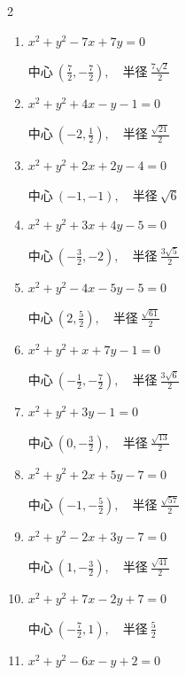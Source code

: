 \begin{multicols}{2}
\begin{enumerate}
  \item $x^{2}+y^{2}-7x+7y=0$

        $\displaystyle 中心\: \left(\frac{7}{2},-\frac{7}{2}\right), \quad 半径 \ \frac{7\sqrt{2}}{2}$

  \item $x^{2}+y^{2}+4x-y-1=0$

        $\displaystyle 中心\: \left(-2,\frac{1}{2}\right), \quad 半径 \ \frac{\sqrt{21}}{2}$

  \item $x^{2}+y^{2}+2x+2y-4=0$

        $\displaystyle 中心\: \left(-1,-1\right), \quad 半径 \ \sqrt{6}$

  \item $x^{2}+y^{2}+3x+4y-5=0$

        $\displaystyle 中心\: \left(-\frac{3}{2},-2\right), \quad 半径 \ \frac{3\sqrt{5}}{2}$

  \item $x^{2}+y^{2}-4x-5y-5=0$

        $\displaystyle 中心\: \left(2,\frac{5}{2}\right), \quad 半径 \ \frac{\sqrt{61}}{2}$

  \item $x^{2}+y^{2}+x+7y-1=0$

        $\displaystyle 中心\: \left(-\frac{1}{2},-\frac{7}{2}\right), \quad 半径 \ \frac{3\sqrt{6}}{2}$

\columnbreak %

  \item $x^{2}+y^{2}+3y-1=0$

        $\displaystyle 中心\: \left(0,-\frac{3}{2}\right), \quad 半径 \ \frac{\sqrt{13}}{2}$

  \item $x^{2}+y^{2}+2x+5y-7=0$

        $\displaystyle 中心\: \left(-1,-\frac{5}{2}\right), \quad 半径 \ \frac{\sqrt{57}}{2}$

  \item $x^{2}+y^{2}-2x+3y-7=0$

        $\displaystyle 中心\: \left(1,-\frac{3}{2}\right), \quad 半径 \ \frac{\sqrt{41}}{2}$

  \item $x^{2}+y^{2}+7x-2y+7=0$

        $\displaystyle 中心\: \left(-\frac{7}{2},1\right), \quad 半径 \ \frac{5}{2}$

  \item $x^{2}+y^{2}-6x-y+2=0$


\end{enumerate}
\end{multicols}
